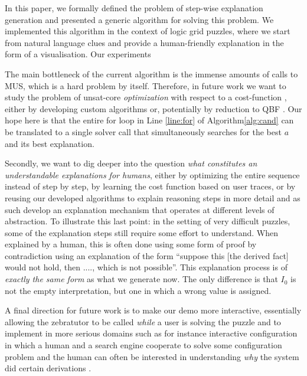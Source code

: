 In this paper, we formally defined the problem of step-wise explanation generation and presented a generic algorithm for solving this problem. 
We implemented this algorithm in the context of logic grid puzzles, where we start from natural language clues and provide a human-friendly explanation in the form of a visualisation.
Our experiments 


The main bottleneck of the current algorithm is the immense amounts of calls to MUS, which is a hard problem by itself. 
Therefore, in future work we want to study the problem of unsat-core \emph{optimization} with respect to a cost-function , either by  developing custom algorithms or, potentially by reduction to QBF \cite{QBF}.
Our hope here is that the entire for loop in Line \ref{line:for} of Algorithm\ref{alg:cand} can be translated to a single solver call that simultaneously searches for the best $a$ and its best explanation. 

Secondly, we want to dig deeper into the question \emph{what constitutes an understandable explanations for humans}, either by optimizing the entire sequence instead of step by step, by learning the cost function based on user traces, or by reusing our developed algorithms to explain reasoning steps in more detail and as such develop an explanation mechanism that operates at different levels of abstraction. 
To illustrate this last point: in the setting of very difficult puzzles, some of the explanation steps still require some effort to understand. 
When explained by a human, this is often done using some form of proof by contradiction using an explanation of the form ``suppose this [the derived fact] would not hold, then ...., which is not possible''. 
This explanation process is of \emph{exactly the same form} as what we generate now. The only difference is that $I_0$ is not the empty interpretation, but one in which a wrong value is assigned. 

A final direction for future work is to make our demo more interactive, essentially allowing the zebratutor to be called \emph{while} a user is solving the puzzle and to implement in more serious domains such as for instance interactive configuration in which a human and a search engine cooperate to solve some configuration problem and the human can often be interested in understanding \emph{why} the system did certain derivations \cite{DBLP:journals/tplp/HertumDJD17,DBLP:conf/bnaic/CarbonnelleADVD19}. 






